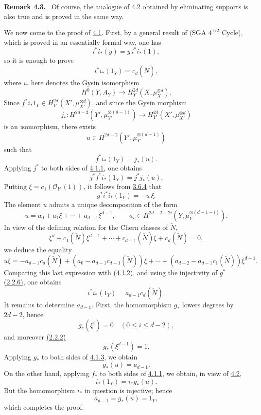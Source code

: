 \documentclass[11pt]{article}
\newenvironment{statement}[1]{\par\medskip\noindent\textbf{#1.}\ }{\par\medskip}
\begin{document}
\label{sga5:VII:remark:4.3}\begin{statement}{Remark 4.3}
Of course, the analogue of \hyperref[sga5:VII:lemma:4.2]{4.2} obtained by eliminating supports is also true and is proved in the same way.
\end{statement}

We now come to the proof of \hyperref[sga5:VII:theorem:4.1]{4.1}. First, by a general result of (SGA $4^{1/2}$ Cycle), which is proved in an essentially formal way, one has
\[
i^*i_*(y)=y\,i^*i_*(1),
\]
so it is enough to prove
\[
i^*i_*(1_Y)=c_d(\check N),
\]
where $i_*$ here denotes the Gysin isomorphism
\[
H^0(Y,A_Y)\to H_Y^{2d}(X,\mu_X^{\otimes d}).
\]
Since $f^*i_*1_Y\in H_{Y'}^{2d}(X',\mu_{X'}^{\otimes d})$, and since the Gysin morphism
\[
j_*:H^{2d-2}(Y',\mu_{Y'}^{\otimes(d-1)})
\to H_{Y'}^{2d}(X',\mu_{X'}^{\otimes d})
\]
is an isomorphism, there exists
\[
u\in H^{2d-2}(Y',\mu_{Y'}^{\otimes(d-1)})
\]
such that
\[
f^*i_*(1_Y)=j_*(u).
\tag{4.1.1}\label{sga5:VII:equation:4.1.1}
\]
Applying $j^*$ to both sides of \hyperref[sga5:VII:equation:4.1.1]{4.1.1}, one obtains
\[
j^*f^*i_*(1_Y)=j^*j_*(u).
\]
Putting $\xi=c_1(\mathcal O_{Y'}(1))$, it follows from \hyperref[sga5:VII:equation:3.6.4]{3.6.4} that
\[
g^*i^*i_*(1_Y)=-u\,\xi.
\tag{4.1.2}\label{sga5:VII:equation:4.1.2}
\]
The element $u$ admits a unique decomposition of the form
\[
u=a_0+a_1\xi+\cdots+a_{d-1}\xi^{d-1},
\qquad
a_i\in H^{2d-2-2i}(Y,\mu_Y^{\otimes(d-1-i)}).
\tag{4.1.3}\label{sga5:VII:equation:4.1.3}
\]
In view of the defining relation for the Chern classes of $\check N$,
\[
\xi^d+c_1(\check N)\xi^{d-1}+\cdots+c_{d-1}(\check N)\xi+c_d(\check N)=0,
\tag{4.1.4}\label{sga5:VII:equation:4.1.4}
\]
we deduce the equality
\[
u\xi=-a_{d-1}c_d(\check N)+(a_0-a_{d-1}c_{d-1}(\check N))\xi
+\cdots+(a_{d-2}-a_{d-1}c_1(\check N))\xi^{d-1}.
\]
Comparing this last expression with \hyperref[sga5:VII:equation:4.1.2]{(4.1.2)}, and using the injectivity of $g^*$ \hyperref[sga5:VII:corollary:2.2.6]{(2.2.6)}, one obtains
\[
i^*i_*(1_Y)=a_{d-1}c_d(\check N).
\tag{4.1.5}\label{sga5:VII:equation:4.1.5}
\]
It remains to determine $a_{d-1}$. First, the homomorphism $g_*$ lowers degrees by $2d-2$, hence
\[
g_*(\xi^i)=0\quad(0\le i\le d-2),
\]
and moreover \hyperref[sga5:VII:proposition:2.2.2]{(2.2.2)}
\[
g_*(\xi^{d-1})=1.
\]
Applying $g_*$ to both sides of \hyperref[sga5:VII:equation:4.1.3]{4.1.3}, we obtain
\[
g_*(u)=a_{d-1}.
\tag{4.1.6}\label{sga5:VII:equation:4.1.6}
\]
On the other hand, applying $f_*$ to both sides of \hyperref[sga5:VII:equation:4.1.1]{4.1.1}, we obtain, in view of \hyperref[sga5:VII:lemma:4.2]{4.2},
\[
i_*(1_Y)=i_*g_*(u).
\tag{4.1.7}\label{sga5:VII:equation:4.1.7}
\]
But the homomorphism $i_*$ in question is injective; hence
\[
a_{d-1}=g_*(u)=1_Y,
\]
which completes the proof.
\end{document}
